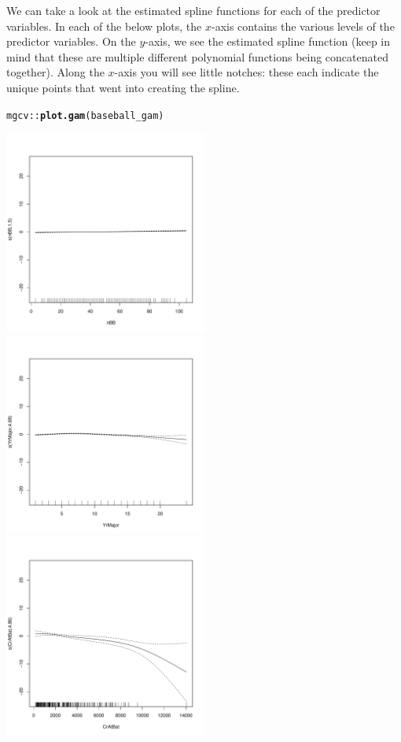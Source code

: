 \documentclass{article}\usepackage[]{graphicx}\usepackage[]{color}
\makeatletter
\newcommand{\hlopt}[1]{\textcolor[rgb]{0,0,0}{#1}}%
\newcommand{\hlstd}[1]{\textcolor[rgb]{0.345,0.345,0.345}{#1}}%
\newcommand{\hlkwd}[1]{\textcolor[rgb]{0.737,0.353,0.396}{\textbf{#1}}}%
\newenvironment{kframe}{%
 \def\at@end@of@kframe{}%
 \ifinner\ifhmode%
  \def\at@end@of@kframe{\end{minipage}}%
  \begin{minipage}{\columnwidth}%
 \fi\fi%
 \def\FrameCommand##1{\hskip\@totalleftmargin \hskip-\fboxsep
 \colorbox{shadecolor}{##1}\hskip-\fboxsep
     \hskip-\linewidth \hskip-\@totalleftmargin \hskip\columnwidth}%
 \MakeFramed {\advance\hsize-\width
   \@totalleftmargin\z@ \linewidth\hsize
   \@setminipage}}%
 {\par\unskip\endMakeFramed%
 \at@end@of@kframe}
\newenvironment{knitrout}{}{} %
\makeatother
\begin{document}
We can take a look at the estimated spline functions for each of the predictor variables. In each of the below plots, the $x$-axis contains the various levels of the predictor variables. On the $y$-axis, we see the estimated spline function (keep in mind that these are multiple different polynomial functions being concatenated together). Along the $x$-axis you will see little notches: these each indicate the unique points that went into creating the spline.

\begin{knitrout}
\color{fgcolor}\begin{kframe}
\begin{alltt}
\hlstd{mgcv}\hlopt{::}\hlkwd{plot.gam}\hlstd{(baseball_gam)}
\end{alltt}
\end{kframe}
\includegraphics[width=0.50\textwidth]{figure/unnamed-chunk-3-1} 
\includegraphics[width=0.50\textwidth]{figure/unnamed-chunk-3-2} 
\includegraphics[width=0.50\textwidth]{figure/unnamed-chunk-3-3} 

\end{knitrout}
\end{document}
